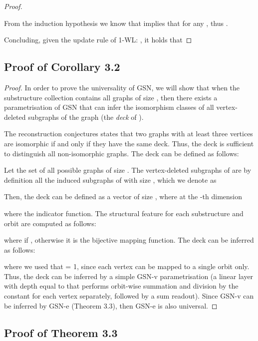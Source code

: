 \begin{proof}
\begin{itemize}[wide, labelwidth=!, labelindent=0pt]
From the induction hypothesis we know that   implies that  for any  , thus .
\end{itemize}
Concluding, given the update rule of 1-WL: , it holds that 

\end{proof}

\subsection{Proof of Corollary 3.2}\label{sec:proof_universality}
\begin{proof}
In order to prove the universality of GSN, we will show that when the substructure collection contains all graphs of size , then there exists a parametrisation of GSN that can infer the isomorphism classes of all vertex-deleted subgraphs of the graph  (the \textit{deck} of ). 

The reconstruction conjectures states that two graphs with at least three vertices are isomorphic if and only if they have the same deck. Thus, the deck is sufficient to distinguish all non-isomorphic graphs. The deck can be defined as follows:

Let  the set of all possible graphs of size . The vertex-deleted subgraphs of  are by definition all the induced subgraphs of  with size , which we denote as

Then, the deck  can be defined as a vector of size , where at the -th dimension

where  the indicator function. 
The structural feature   for each substructure  and orbit  are computed as follows:

where  if , otherwise it is the bijective mapping function. The deck can be inferred as follows:

where we used that  = 1, since each vertex can be mapped to a single orbit only. Thus, the deck can be inferred by a simple GSN-v parametrisation (a linear layer with depth equal to  that performs orbit-wise summation and division by the constant  for each vertex separately, followed by a sum readout). Since GSN-v can be inferred by GSN-e (Theorem 3.3), then GSN-e is also universal.
\end{proof}


\subsection{Proof of Theorem 3.3}\label{proof_GSNv_GSNe}


